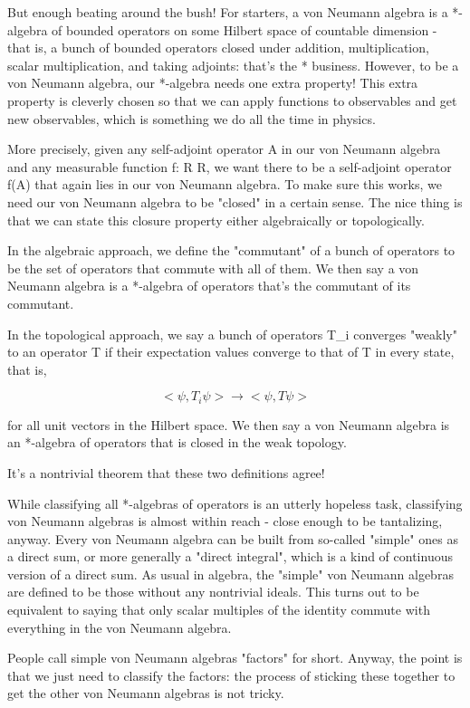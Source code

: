 But enough beating around the bush!  For starters, a von Neumann algebra
is a *-algebra of bounded operators on some Hilbert space of countable
dimension - that is, a bunch of bounded operators closed under addition,
multiplication, scalar multiplication, and taking adjoints: that's the *
business.  However, to be a von Neumann algebra, our *-algebra needs one
extra property!  This extra property is cleverly chosen so that we can
apply functions to observables and get new observables, which is
something we do all the time in physics.  

More precisely, given any self-adjoint operator A in our von Neumann
algebra and any measurable function f: R \to  R, we want there to be a
self-adjoint operator f(A) that again lies in our von Neumann algebra.
To make sure this works, we need our von Neumann algebra to be "closed"
in a certain sense.   The nice thing is that we can state this closure
property either algebraically or topologically.  

In the algebraic approach, we define the "commutant" of a bunch of
operators to be the set of operators that commute with all of them.  
We then say a von Neumann algebra is a *-algebra of operators that's 
the commutant of its commutant.  

In the topological approach, we say a bunch of operators T_{i}
converges "weakly" to an operator T if their expectation
values converge to that of T in every state, that is,

$$
<\psi , T_{i} \psi >  \to   <\psi , T \psi >
$$
    
for all unit vectors \psi  in the Hilbert space.  We then say a von 
Neumann algebra is an *-algebra of operators that is closed in the 
weak topology.  

It's a nontrivial theorem that these two definitions agree!

While classifying all *-algebras of operators is an utterly hopeless
task, classifying von Neumann algebras is almost within reach - close
enough to be tantalizing, anyway.  Every von Neumann algebra can be
built from so-called "simple" ones as a direct sum, or more generally a
"direct integral", which is a kind of continuous version of a direct
sum.  As usual in algebra, the "simple" von Neumann algebras are defined
to be those without any nontrivial ideals.  This turns out to be
equivalent to saying that only scalar multiples of the identity commute
with everything in the von Neumann algebra.   

People call simple von Neumann algebras "factors" for short.  Anyway, 
the point is that we just need to classify the factors: the process 
of sticking these together to get the other von Neumann algebras is
not tricky.



